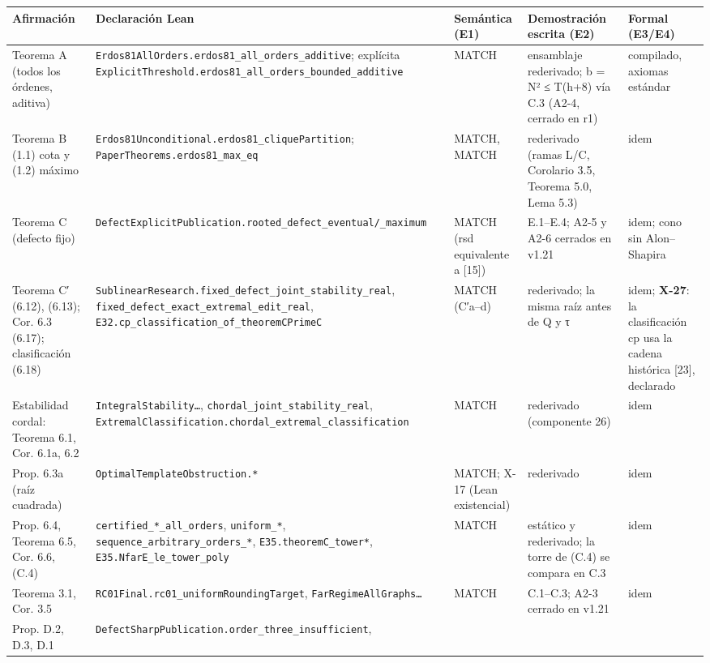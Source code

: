 \documentclass[
]{article}
\newcounter{none} %
\begin{document}
{\def\LTcaptype{none} %
\begin{longtable}[]{@{}lllll@{}}
\toprule\noalign{}
Afirmación & Declaración Lean & Semántica (E1) & Demostración escrita
(E2) & Formal (E3/E4) \\
\midrule\noalign{}
\endhead
\bottomrule\noalign{}
\endlastfoot
Teorema A (todos los órdenes, aditiva) &
\texttt{Erdos81AllOrders.erdos81\_all\_orders\_additive}; explícita
\texttt{ExplicitThreshold.erdos81\_all\_orders\_bounded\_additive} &
MATCH & ensamblaje rederivado; b = N² ≤ T(h+8) vía C.3 (A2-4, cerrado en
r1) & compilado, axiomas estándar \\
Teorema B (1.1) cota y (1.2) máximo &
\texttt{Erdos81Unconditional.erdos81\_cliquePartition};
\texttt{PaperTheorems.erdos81\_max\_eq} & MATCH, MATCH & rederivado
(ramas L/C, Corolario 3.5, Teorema 5.0, Lema 5.3) & idem \\
Teorema C (defecto fijo) &
\texttt{DefectExplicitPublication.rooted\_defect\_eventual/\_maximum} &
MATCH (rsd equivalente a {[}15{]}) & E.1--E.4; A2-5 y A2-6 cerrados en
v1.21 & idem; cono sin Alon--Shapira \\
Teorema C′ (6.12), (6.13); Cor. 6.3 (6.17); clasificación (6.18) &
\texttt{SublinearResearch.fixed\_defect\_joint\_stability\_real},
\texttt{fixed\_defect\_exact\_extremal\_edit\_real},
\texttt{E32.cp\_classification\_of\_theoremCPrimeC} & MATCH (C′a--d) &
rederivado; la misma raíz antes de Q y τ & idem; \textbf{X-27}: la
clasificación cp usa la cadena histórica {[}23{]}, declarado \\
Estabilidad cordal: Teorema 6.1, Cor. 6.1a, 6.2 &
\texttt{IntegralStability…}, \texttt{chordal\_joint\_stability\_real},
\texttt{ExtremalClassification.chordal\_extremal\_classification} &
MATCH & rederivado (componente 26) & idem \\
Prop. 6.3a (raíz cuadrada) & \texttt{OptimalTemplateObstruction.*} &
MATCH; X-17 (Lean existencial) & rederivado & idem \\
Prop. 6.4, Teorema 6.5, Cor. 6.6, (C.4) &
\texttt{certified\_*\_all\_orders}, \texttt{uniform\_*},
\texttt{sequence\_arbitrary\_orders\_*}, \texttt{E35.theoremC\_tower*},
\texttt{E35.NfarE\_le\_tower\_poly} & MATCH & estático y rederivado; la
torre de (C.4) se compara en C.3 & idem \\
Teorema 3.1, Cor. 3.5 & \texttt{RC01Final.rc01\_uniformRoundingTarget},
\texttt{FarRegimeAllGraphs…} & MATCH & C.1--C.3; A2-3 cerrado en v1.21 &
idem \\
Prop. D.2, D.3, D.1 &
\texttt{DefectSharpPublication.order\_three\_insufficient},

\end{longtable}}
\end{document}
